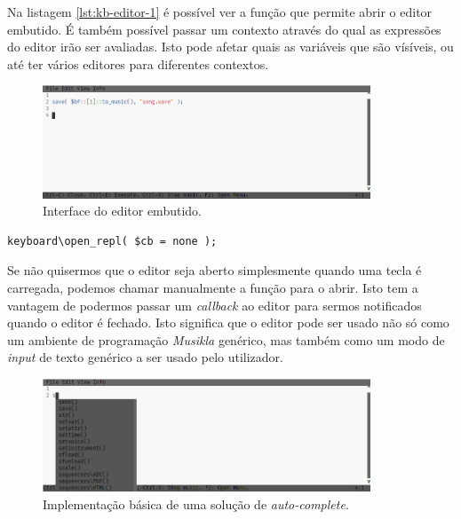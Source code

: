 Na listagem \ref{lst:kb-editor-1} é possível ver a função que permite abrir o editor embutido. É também possível passar um contexto através do qual as expressões do editor irão ser avaliadas. Isto pode afetar quais as variáveis que são vísíveis, ou até ter vários editores para diferentes contextos.

\begin{figure}[h]
\begin{center}
    \includegraphics[width=0.87\textwidth]{img/embedded_editor.png}
\end{center}
\caption{Interface do editor embutido.}
\end{figure}

\begin{lstlisting}[caption={Abrir manualmente o editor},label={lst:kb-editor-2}]
keyboard\open_repl( $cb = none );
\end{lstlisting}

Se não quisermos que o editor seja aberto simplesmente quando uma tecla é carregada, podemos chamar manualmente a função para o abrir. Isto tem a vantagem de podermos passar um \textit{callback} ao editor para sermos notificados quando o editor é fechado. 
Isto significa que o editor pode ser usado não só como um ambiente de programação \textit{Musikla} genérico, mas também como um modo de \textit{input} de texto genérico a ser usado pelo utilizador.

\begin{figure}[h]
\begin{center}
    \includegraphics[width=0.87\textwidth]{img/embedded_editor_autocomplete.png}
\end{center}
\caption{Implementação básica de uma solução de \textit{auto-complete}.}
\end{figure}

